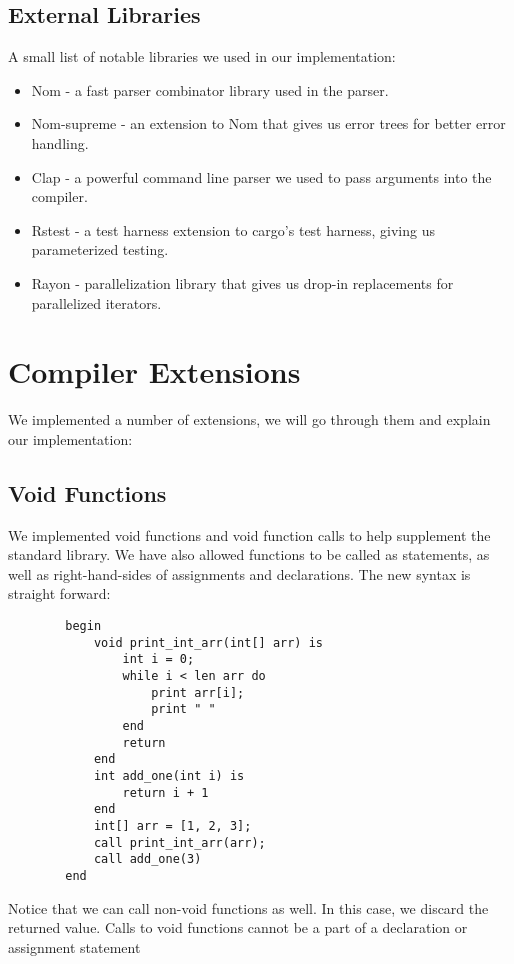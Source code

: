 \documentclass{article}
\begin{document}
        \subsection*{External Libraries}
        A small list of notable libraries we used in our implementation:
        \begin{itemize}
            \item Nom - a fast parser combinator library used in the parser.
            \item Nom-supreme - an extension to Nom that gives us error trees for better error handling.
            \item Clap - a powerful command line parser we used to pass arguments into the compiler.
            \item Rstest - a test harness extension to cargo's test harness, giving us parameterized testing.
            \item Rayon - parallelization library that gives us drop-in replacements for parallelized iterators.
        \end{itemize}
        
        
        


    \section*{Compiler Extensions}
        
        We implemented a number of extensions, we will go through them and explain our implementation:
        \subsection*{Void Functions}
        We implemented void functions and void function calls to help supplement the standard library. We have also allowed functions to be called as statements, as well as right-hand-sides of assignments and declarations. The new syntax is straight forward:
        \begin{verbatim}
        begin
            void print_int_arr(int[] arr) is
                int i = 0;
                while i < len arr do
                    print arr[i];
                    print " "
                end
                return
            end
            int add_one(int i) is
                return i + 1
            end
            int[] arr = [1, 2, 3];
            call print_int_arr(arr);
            call add_one(3)
        end
        \end{verbatim}
        Notice that we can call non-void functions as well. In this case, we discard the returned value. Calls to void functions cannot be a part of a declaration or assignment statement
\end{document}
